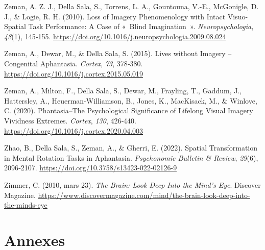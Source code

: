 \documentclass[
  12pt,
]{article}
\newlength{\cslhangindent}
\newlength{\cslentryspacingunit} %
\newenvironment{CSLReferences}[2] %
 {%
  \setlength{\parindent}{0pt}
  \ifodd #1
  \let\oldpar\par
  \def\par{\hangindent=\cslhangindent\oldpar}
  \fi
  \setlength{\parskip}{#2\cslentryspacingunit}
 }%
 {}
\begin{document}
\begin{CSLReferences}{1}{0}
\leavevmode{}%
Zeman, A. Z. J., Della Sala, S., Torrens, L. A., Gountouna, V.-E.,
McGonigle, D. J., \& Logie, R. H. (2010). Loss of Imagery Phenomenology
with Intact Visuo-Spatial Task Performance: {A} Case of {«~Blind
Imagination~»}. \emph{Neuropsychologia}, \emph{48}(1), 145‑155.
\url{https://doi.org/10.1016/j.neuropsychologia.2009.08.024}

\leavevmode{}%
Zeman, A., Dewar, M., \& Della Sala, S. (2015). Lives without Imagery --
{Congenital} Aphantasia. \emph{Cortex}, \emph{73}, 378‑380.
\url{https://doi.org/10.1016/j.cortex.2015.05.019}

\leavevmode{}%
Zeman, A., Milton, F., Della Sala, S., Dewar, M., Frayling, T., Gaddum,
J., Hattersley, A., Heuerman-Williamson, B., Jones, K., MacKisack, M.,
\& Winlove, C. (2020). Phantasia--{The} Psychological Significance of
Lifelong Visual Imagery Vividness Extremes. \emph{Cortex}, \emph{130},
426‑440. \url{https://doi.org/10.1016/j.cortex.2020.04.003}

\leavevmode{}%
Zhao, B., Della Sala, S., Zeman, A., \& Gherri, E. (2022). Spatial
Transformation in Mental Rotation Tasks in Aphantasia. \emph{Psychonomic
Bulletin \& Review}, \emph{29}(6), 2096‑2107.
\url{https://doi.org/10.3758/s13423-022-02126-9}

\leavevmode{}%
Zimmer, C. (2010, mars 23). \emph{The {Brain}: {Look Deep Into} the
{Mind}'s {Eye}}. {Discover Magazine}.
\url{https://www.discovermagazine.com/mind/the-brain-look-deep-into-the-minds-eye}

\end{CSLReferences}

\newpage

\hypertarget{annexes}{%
\section*{Annexes}\label{annexes}}
\end{document}
